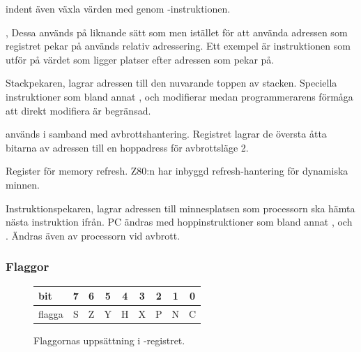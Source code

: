 \documentclass[main.tex]{subfiles}
\begin{document}
\begin{labeling}{indent}
    även växla värden med  genom -instruktionen.
\item[\mono{IX}, \mono{IY}]
    Dessa används på liknande sätt som  men istället för att använda
    adressen som registret pekar på används relativ adressering. Ett exempel är
    instruktionen  som utför  på värdet som ligger
     platser efter adressen som  pekar på.
\item[\mono{SP}]
    Stackpekaren, lagrar adressen till den nuvarande toppen av stacken.
    Speciella instruktioner som bland annat ,  och
     modifierar  medan programmerarens förmåga att direkt
    modifiera  är begränsad.
\item[\mono{I}]
     används i samband med avbrottshantering. Registret lagrar de
    översta åtta bitarna av adressen till en hoppadress för avbrottsläge 2.
\item[\mono{R}]
    Register för memory refresh. Z80:n har inbyggd refresh-hantering för
    dynamiska minnen.
\item[\mono{PC}]
    Instruktionspekaren, lagrar adressen till minnesplatsen som processorn ska
    hämta nästa instruktion ifrån. PC ändras med hoppinstruktioner som bland
    annat ,  och . Ändras även av processorn vid
    avbrott.
\end{labeling}

\subsubsection{Flaggor}
\label{sec:theory:flags}

\begin{figure}
    \center
    \begin{tabular}{|l|c|c|c|c|c|c|c|c|}
        \hline
        bit     & 7 & 6 & 5 & 4 & 3 & 2 & 1 & 0 \\ \hline
        flagga  & S & Z & Y & H & X & P & N & C \\ \hline
    \end{tabular}
    \caption{Flaggornas uppsättning i -registret.}
    \label{fig:flags}
\end{figure}
\end{document}
